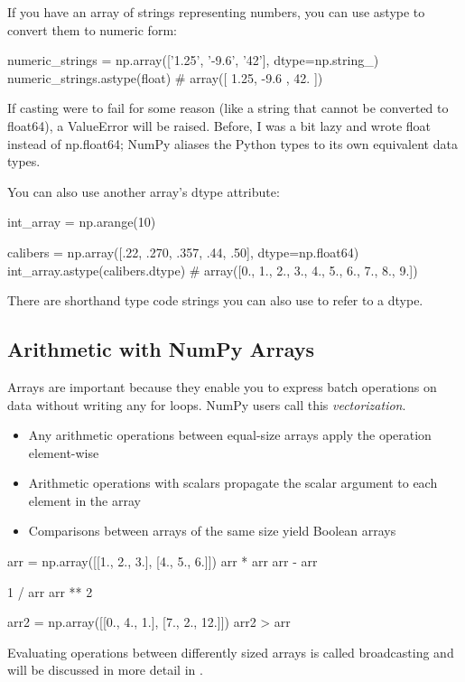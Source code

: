If you have an array of strings representing numbers, you can use astype to convert them to numeric form:
\begin{pyc}
numeric_strings = np.array(['1.25', '-9.6', '42'], dtype=np.string_)
numeric_strings.astype(float)
# array([ 1.25, -9.6 , 42.  ])
\end{pyc}


If casting were to fail for some reason (like a string that cannot be converted to float64), a ValueError will be raised. Before, I was a bit lazy and wrote float instead of np.float64; NumPy aliases the Python types to its own equivalent data types.

You can also use another array's dtype attribute:
\begin{pyc}
int_array = np.arange(10)

calibers = np.array([.22, .270, .357, .44, .50], dtype=np.float64)
int_array.astype(calibers.dtype)
# array([0., 1., 2., 3., 4., 5., 6., 7., 8., 9.])
\end{pyc}

There are shorthand type code strings you can also use to refer to a dtype.


\subsection{Arithmetic with NumPy Arrays}
Arrays are important because they enable you to express batch operations on data  without writing any for loops. NumPy users call this \emph{vectorization}.
\begin{itemize}
    \item Any arithmetic operations between equal-size arrays apply the operation element-wise
    \item Arithmetic operations with scalars propagate the scalar argument to each element in the array
    \item Comparisons between arrays of the same size yield Boolean arrays
\end{itemize}
\begin{pyc}
arr = np.array([[1., 2., 3.], [4., 5., 6.]])
arr * arr
arr - arr

1 / arr
arr ** 2

arr2 = np.array([[0., 4., 1.], [7., 2., 12.]])
arr2 > arr
\end{pyc}
Evaluating operations between differently sized arrays is called broadcasting and will be discussed in more detail in .
